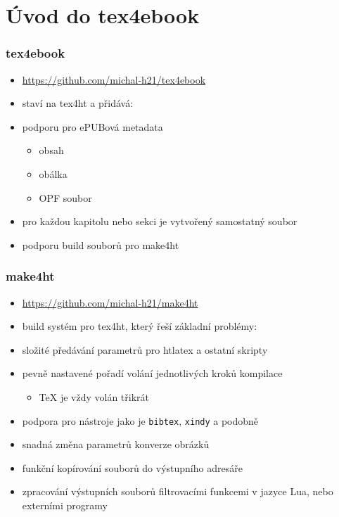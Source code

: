 \documentclass[czech]{beamer}
\begin{document}
\section{Úvod do tex4ebook}

\begin{frame}
  \frametitle{tex4ebook}
  \begin{itemize}
  \item  \url{https://github.com/michal-h21/tex4ebook}
  \item   staví na tex4ht a přidává:
  \item   podporu pro ePUBová metadata 
    \begin{itemize}
  \item    obsah
  \item    obálka
  \item    OPF soubor
\end{itemize}
  \item   pro každou kapitolu nebo sekci je vytvořený samostatný soubor
  \item   podporu build souborů pro make4ht
\end{itemize}
\end{frame}
\begin{frame}
  \frametitle{make4ht} 
  \begin{itemize}
    \item   \url{https://github.com/michal-h21/make4ht}
    \item build systém pro tex4ht, který řeší základní problémy:
    \item složité předávání parametrů pro htlatex a ostatní skripty
    \item pevně nastavené pořadí volání jednotlivých kroků kompilace
      \begin{itemize}
        \item TeX je vždy volán třikrát
      \end{itemize}
    \item podpora pro nástroje jako je \texttt{bibtex}, \texttt{xindy} a podobně
    \item  snadná změna parametrů konverze obrázků
    \item funkční kopírování souborů do výstupního adresáře
    \item zpracování výstupních souborů filtrovacími funkcemi v jazyce Lua, nebo externími
      programy
  \end{itemize}
\end{frame}
\end{document}

